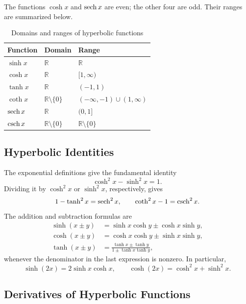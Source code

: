 The functions \(\cosh x\) and \(\operatorname{sech} x\) are even; the other four are
odd.  Their ranges are summarized below.
\begin{table}[H]
    \centering
    \begin{tabular}{lll}
        \toprule
        Function & Domain & Range \\
        \midrule
        \(\sinh x\) & \(\mathbb{R}\) & \(\mathbb{R}\) \\
        \(\cosh x\) & \(\mathbb{R}\) & \([1,\infty)\) \\
        \(\tanh x\) & \(\mathbb{R}\) & \((-1,1)\) \\
        \(\coth x\) & \(\mathbb{R}\setminus\{0\}\)
            & \(( -\infty,-1)\cup(1,\infty)\) \\
        \(\operatorname{sech} x\) & \(\mathbb{R}\) & \((0,1]\) \\
        \(\operatorname{csch} x\) & \(\mathbb{R}\setminus\{0\}\)
            & \(\mathbb{R}\setminus\{0\}\) \\
        \bottomrule
    \end{tabular}
    \caption{Domains and ranges of hyperbolic functions}
    \label{tab:hyperbolic-domains-ranges}
\end{table}

\subsection{Hyperbolic Identities}

The exponential definitions give the fundamental identity
\[
    \cosh^2x-\sinh^2x=1.
\]
Dividing it by \(\cosh^2x\) or \(\sinh^2x\), respectively, gives
\[
    1-\tanh^2x=\operatorname{sech}^2x,
    \qquad
    \coth^2x-1=\operatorname{csch}^2x.
\]
The addition and subtraction formulas are
\begin{align*}
    \sinh(x\pm y)&=\sinh x\cosh y\pm\cosh x\sinh y,\\
    \cosh(x\pm y)&=\cosh x\cosh y\pm\sinh x\sinh y,\\
    \tanh(x\pm y)&=\frac{\tanh x\pm\tanh y}
        {1\pm\tanh x\tanh y},
\end{align*}
whenever the denominator in the last expression is nonzero.  In
particular,
\[
    \sinh(2x)=2\sinh x\cosh x,
    \qquad
    \cosh(2x)=\cosh^2x+\sinh^2x.
\]

\subsection{Derivatives of Hyperbolic Functions}

